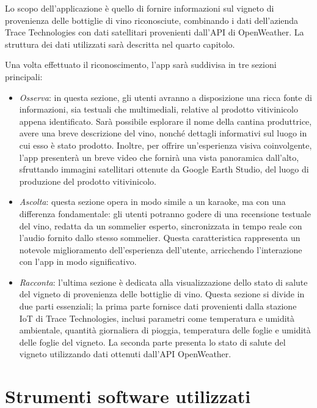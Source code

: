 Lo scopo dell'applicazione è quello di fornire informazioni sul vigneto di provenienza delle bottiglie di vino riconosciute, combinando i dati dell'azienda Trace Technologies con dati satellitari provenienti dall'API di OpenWeather. La struttura dei dati utilizzati sarà descritta nel quarto capitolo.

Una volta effettuato il riconoscimento, l'app sarà suddivisa in tre sezioni principali:

\begin{itemize}
    \item \textit{Osserva}: in questa sezione, gli utenti avranno a disposizione una ricca fonte di informazioni, sia testuali che multimediali, relative al prodotto vitivinicolo appena identificato. Sarà possibile esplorare il nome della cantina produttrice, avere una breve descrizione del vino, nonché dettagli informativi sul luogo in cui esso è stato prodotto. Inoltre, per offrire un'esperienza visiva coinvolgente, l'app presenterà un breve video che fornirà una vista panoramica dall'alto, sfruttando immagini satellitari ottenute da Google Earth Studio, del luogo di produzione del prodotto vitivinicolo.
    \item \textit{Ascolta}: questa sezione opera in modo simile a un karaoke, ma con una differenza fondamentale: gli utenti potranno godere di una recensione testuale del vino, redatta da un sommelier esperto, sincronizzata in tempo reale con l'audio fornito dallo stesso sommelier. Questa caratteristica rappresenta un notevole miglioramento dell'esperienza dell'utente, arricchendo l'interazione con l'app in modo significativo.
    \item \textit{Racconta}: l'ultima sezione è dedicata alla visualizzazione dello stato di salute del vigneto di provenienza delle bottiglie di vino. Questa sezione si divide in due parti essenziali; la prima parte fornisce dati provenienti dalla stazione IoT di Trace Technologies, inclusi parametri come temperatura e umidità ambientale, quantità giornaliera di pioggia, temperatura delle foglie e umidità delle foglie del vigneto. La seconda parte presenta lo stato di salute del vigneto utilizzando dati ottenuti dall'API OpenWeather.

\end{itemize}

\section{Strumenti software utilizzati}

